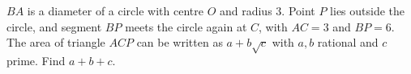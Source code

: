 $BA$ is a diameter of a circle with centre $O$ and radius $3$. Point $P$ lies outside the circle, and segment $BP$ meets the circle again at $C$, with $AC=3$ and $BP=6$. The area of triangle $ACP$ can be written as $a+b\sqrt c$ with $a,b$ rational and $c$ prime. Find $a+b+c$.
